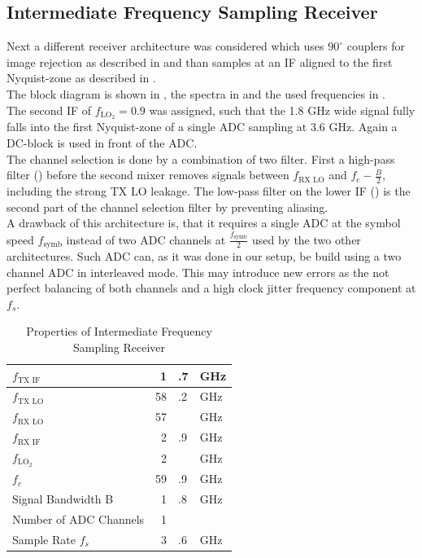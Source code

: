 \subsection{Intermediate Frequency Sampling Receiver}
\label{sec:rx_1}
Next a different receiver architecture was considered which uses
$90^\circ$ couplers for image rejection as described in 
and than samples at an \gls{IF} aligned to the first Nyquist-zone as described
in . \\

The block diagram is shown in , the spectra in
 and the used frequencies in . \\

The second \gls{IF} of $f_{\text{LO}_2} = 0.9$ was assigned, such that
the 1.8 GHz wide signal fully falls into the first Nyquist-zone of
a single \gls{ADC} sampling at 3.6 GHz. Again a \gls{DC}-block
is used in front of the \gls{ADC}. \\

The channel selection is done by a combination of two filter. First
a  high-pass filter () before
the second mixer removes signals between $f_{\text{RX LO}}$ and
$f_{\text{c}} - \frac{B}{2}$, including the strong \gls{TX} \gls{LO}
leakage. The low-pass filter on the lower \gls{IF}
() is the second part of the channel
selection filter by preventing aliasing. \\

A drawback of this architecture is, that it requires a single \gls{ADC}
at the symbol speed $f_{\text{symb}}$ instead of two \gls{ADC} channels at
$\frac{f_{\text{symb}}}{2}$ used by the two other architectures.
Such \gls{ADC} can, as it was done in our setup, be build using a two channel
\gls{ADC} in interleaved mode. This may introduce new errors as the not
perfect balancing of both channels and a high clock jitter frequency
component at $f_{s}$. \\

\begin{table}[h]
  \centering
  \begin{tabular}{|l|r@{}l@{~}l|}
    \hline
    $f_{\text{TX IF}}$ & 1&.7&GHz \\ \hline
    $f_{\text{TX LO}}$ & 58&.2&GHz \\ \hline
    $f_{\text{RX LO}}$ & 57&&GHz \\ \hline
    $f_{\text{RX IF}}$ & 2&.9&GHz \\ \hline
    $f_{\text{LO}_2} $ & 2&&GHz \\ \hline
    $f_c$           & 59&.9&GHz \\ \hline
    Signal Bandwidth B & 1&.8&GHz \\ \hline
    Number of \gls{ADC} Channels & 1&& \\ \hline
    Sample Rate $f_s$ & 3&.6&GHz \\ \hline
  \end{tabular}
  \caption{Properties of Intermediate Frequency Sampling Receiver}
  \label{tab:rx_1}
\end{table}

